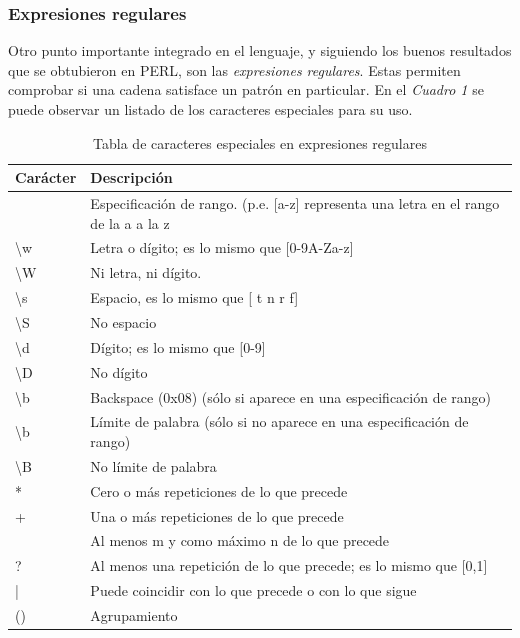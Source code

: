 \documentclass{article}
\begin{document}
\subsubsection{Expresiones regulares}
Otro punto importante integrado en el lenguaje, y siguiendo los buenos resultados que se obtubieron en PERL, son las \textit{expresiones regulares}. Estas permiten comprobar si una cadena satisface un patrón en particular. En el \textit{Cuadro 1} se puede observar un listado de los caracteres especiales para su uso.\\

\begin{table}[!hbt]
	\begin{center}
	\begin{tabular}{| l | l |}
		\hline
		\rowcolor[gray]{0.9}\textbf{Carácter} & \textbf{Descripción} \\
		\hline
		[] & Especificación de rango. (p.e. [a-z] representa una letra en el rango de la a a la z \\
		\hline
		\textbackslash w & Letra o dígito; es lo mismo que [0-9A-Za-z] \\
		\hline
		\textbackslash W & Ni letra, ni dígito. \\
		\hline
		\textbackslash s & Espacio, es lo mismo que [ t n r f] \\
		\hline
		\textbackslash S & No espacio \\
		\hline
		\textbackslash d & Dígito; es lo mismo que [0-9] \\
		\hline
		\textbackslash D & No dígito \\
		\hline
		\textbackslash b & Backspace (0x08) (sólo si aparece en una especificación de rango) \\
		\hline
		\textbackslash b & Límite de palabra (sólo si no aparece en una especificación de rango) \\
		\hline
		\textbackslash B & No límite de palabra \\
		\hline
		* & Cero o más repeticiones de lo que precede	\\
		\hline
		+ & Una o más repeticiones de lo que precede \\
		\hline
		[m,n] & Al menos m y como máximo n de lo que precede \\
		\hline
		? & Al menos una repetición de lo que precede; es lo mismo que [0,1]	\\
		\hline
		| & Puede coincidir con lo que precede o con lo que sigue \\
		\hline
		() & Agrupamiento \\
		\hline
	\end{tabular}
	\caption{Tabla de caracteres especiales en expresiones regulares}
	\end{center}

\end{table}
\end{document}
